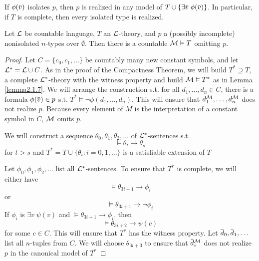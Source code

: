 \documentclass[11pt]{article}
\begin{document}
\begin{proposition}[]
If \(\phi(\barv)\) isolates \(p\), then \(p\) is realized in any model of \(T\cup\{\exists\barv\;\phi(\barv)\}\).
In particular, if \(T\) is complete, then every isolated type is realized.
\end{proposition}

\begin{theorem}
Let \(\mathcal{L}\)  be countable language, \(T\) an \(\mathcal{L}\)-theory, and \(p\) a (possibly incomplete)
nonisolated \(n\)-types over \(\emptyset\). Then there is a countable \(\mathcal{M}\vDash T\) omitting \(p\).
\end{theorem}

\begin{proof}
Let \(C=\{c_0,c_1,\dots\}\) be countably many new constant symbols, and let \(\mathcal{L}^*=\mathcal{L}\cup C\). As in the
proof of the Compactness Theorem, we will build \(T^*\supseteq T\), a complete \(\mathcal{L}^*\)-theory with the
witness property and build \(\mathcal{M}\vDash T^*\) as in Lemma \ref{lemma2.1.7}. We will arrange the
construction s.t. for all \(d_1,\dots,d_n\in C\), there is a formula \(\phi(\barv)\in p\)
s.t. \(T^*\vDash\neg\phi(d_1,\dots,d_n)\). This will ensure that \(d_1^{\mathcal{M}},\dots,d_n^{\mathcal{M}}\) does not realize \(p\).
Because every element of \(M\) is the interpretation of a constant symbol in \(C\), \(\mathcal{M}\)
omits \(p\).

We will construct a sequence \(\theta_0,\theta_1,\theta_2,\dots\) of \(\mathcal{L}^*\)-sentences s.t.
\begin{equation*}
\vDash\theta_t\to\theta_s
\end{equation*}
for \(t>s\) and \(T^*=T\cup\{\theta_i:i=0,1,\dots\}\) is a satisfiable extension of \(T\)

Let \(\phi_0,\phi_1,\phi_2,\dots\) list all \(\mathcal{L}^*\)-sentences. To ensure that \(T^*\) is complete, we will
either have
\begin{equation*}
\vDash\theta_{3i+1}\to\phi_i
\end{equation*}
or
\begin{equation*}
\vDash\theta_{3i+1}\to\neg\phi_i
\end{equation*}
If \(\phi_i\) is \(\exists v\;\psi(v)\) and \(\vDash\theta_{3i+1}\to\phi_i\), then
\begin{equation*}
\vDash\theta_{3i+2}\to\psi(c)
\end{equation*}
for some \(c\in C\). This will ensure that \(T^*\) has the witness property.
Let \(\bard_0,\bard_1,\dots\) list all \(n\)-tuples from \(C\). We will choose \(\theta_{3i+3}\) to ensure
that \(\bard_i^{\calm}\) does not realize \(p\) in the canonical model of \(T^*\)


\end{proof}
\end{document}
